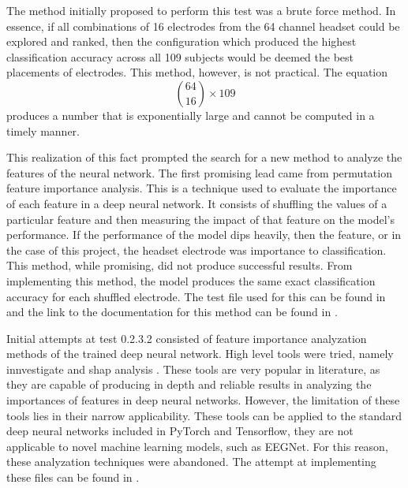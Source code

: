 \documentclass[conference]{IEEEtran}
\begin{document}
    The method initially proposed to perform this test was a brute force method. In essence, if all combinations of 16 electrodes from the 64 channel headset could be explored and ranked, then the configuration which produced the highest classification accuracy across all 109 subjects would be deemed the best placements of electrodes. This method, however, is not practical. The equation \[\binom{64}{16} \times 109 \] produces a number that is exponentially large and cannot be computed in a timely manner.

    This realization of this fact prompted the search for a new method to analyze the features of the neural network. The first promising lead came from permutation feature importance analysis. This is a technique used to evaluate the importance of each feature in a deep neural network. It consists of shuffling the values of a particular feature and then measuring the impact of that feature on the model’s performance. If the performance of the model dips heavily, then the feature, or in the case of this project, the headset electrode was importance to classification. This method, while promising, did not produce successful results. From implementing this method, the model produces the same exact classification accuracy for each shuffled electrode. The test file used for this can be found in \cite{permutation_importance_test_file} and the link to the documentation for this method can be found in \cite{scikit_learn_documentation}.

    Initial attempts at test 0.2.3.2 consisted of feature importance analyzation methods of the trained deep neural network. High level tools were tried, namely innvestigate \cite{innvestigate} and shap analysis \cite{shap_analysis}. These tools are very popular in literature, as they are capable of producing in depth and reliable results in analyzing the importances of features in deep neural networks. However, the limitation of these tools lies in their narrow applicability. These tools can be applied to the standard deep neural networks included in PyTorch and Tensorflow, they are not applicable to novel machine learning models, such as EEGNet. For this reason, these analyzation techniques were abandoned. The attempt at implementing these files can be found in \cite{innvestigate_attempt}.
\end{document}
